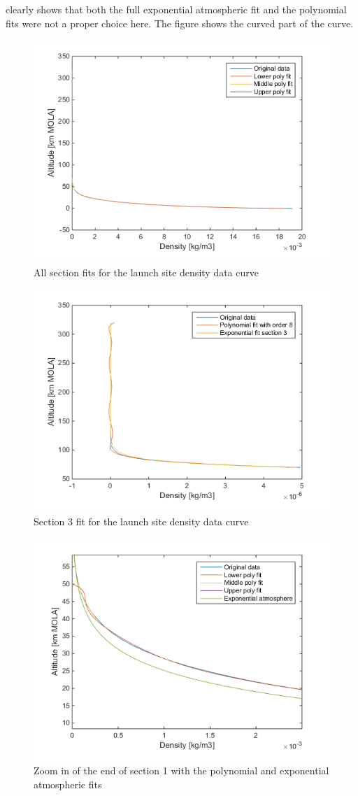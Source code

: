  clearly shows that both the full exponential atmospheric fit and the polynomial fits were not a proper choice here. The figure shows the curved part of the curve.

\begin{figure}[H]
\centering
\includegraphics[width=0.7 \textwidth]{figures/software/completePolyFitDenSplit3.png}
\caption{All section fits for the launch site density data curve}
\label{fig:completePolyFitDenSplit3}
\end{figure}

 

\begin{figure}[H]
\centering
\includegraphics[width=0.7 \textwidth]{figures/software/section3PolyFitDen.png}
\caption{Section 3 fit for the launch site density data curve}
\label{fig:section3PolyFitDen}
\end{figure}



\begin{figure}[H]
\centering
\includegraphics[width=0.7 \textwidth]{figures/software/ExpAtmFitDenZoom.png}
\caption{Zoom in of the end of section 1 with the polynomial and exponential atmospheric fits}
\label{fig:ExpAtmFitDenZoom}
\end{figure}


